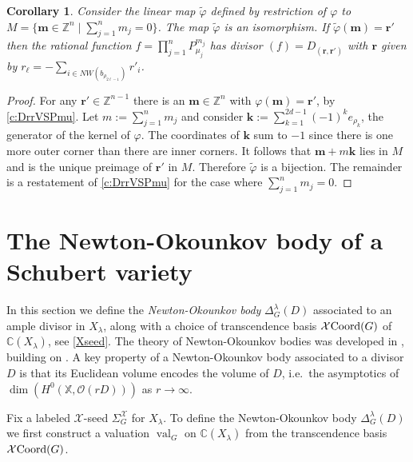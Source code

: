 \documentclass{amsart}
\newtheorem{corollary}[thm]{Corollary}
\theoremstyle{definition}
\numberwithin{equation}{section}
\newcommand{\NO}{\Delta}
\newcommand{\C}{\mathbb{C}}
\newcommand{\Z}{\mathbb{Z}}
\newcommand{\val}{{\operatorname{val}}}
\newcommand{\TBG}{{\mathcal X\hskip -.05cm\operatorname{Coord}(G)}}
\newcommand{\X}{\mathbb X}
\begin{document}
\begin{corollary}\label{c:RationalPmu}
Consider the linear map $\tilde\varphi$ defined by restriction of $\varphi$ to $M=\{\mathbf m\in \Z^{n}\mid \sum_{j=1}^n m_j=0\}$. 
The map $\tilde\varphi$ is an isomorphism. If $\tilde\varphi(\mathbf m)=\mathbf r'$ then the rational function $f=\prod_{j=1}^n P_{\mu_j}^{m_j}$ has divisor $(f)=D_{(\mathbf r,\mathbf r')}$ with $\mathbf r$ given by $r_\ell=-\sum_{i\in NW(b_{\rho_{2\ell-1}})}r'_i$.
\end{corollary}

\begin{proof} For any $\mathbf r'\in\Z^{n-1}$ there is an $\mathbf m\in\Z^n$ with $\varphi(\mathbf m)=\mathbf r'$, by \cref{c:DrrVSPmu}. Let $m:=\sum_{j=1}^n m_j$ and consider $\mathbf k:=\sum_{k=1}^{2d-1} (-1)^k e_{\rho_{k}}$, the generator of the kernel of $\varphi$. The coordinates of $\mathbf k$ sum to $-1$ since there is one more outer corner than there are inner corners. It follows that $\mathbf m + m \mathbf k$ lies in $M$ and is the unique preimage of $\mathbf r'$ in $M$. Therefore $\tilde\varphi$ is a bijection. The remainder is a restatement of \cref{c:DrrVSPmu} for the case where $\sum_{j=1}^{n} m_j=0$. 
\end{proof}

\section{The Newton-Okounkov body of a Schubert variety}\label{sec:NO}





In this section we define the {\it Newton-Okounkov  body} $\NO_{G}^{\lambda}(D)$
 associated to an ample divisor in $X_{\lambda}$, 
 along with a choice of transcendence basis $\TBG$ of $\C(X_{\lambda})$, 
see \cref{Xseed}.
 The theory of Newton-Okounkov bodies was  developed  in 
\cite{KavehKhovanskii,KK2, LazarsfeldMustata, Anderson},  building on 
\cite{Ok96, Okounkov:symplectic,Ok03}. 
 A key property of a Newton-Okounkov  body associated to a divisor $D$ is that its Euclidean volume encodes the volume of $D$, i.e.\ the asymptotics of $\dim(H^0(\X,\mathcal O(rD)))$ as $r\to\infty$.

Fix a  labeled $\mathcal{X}$-seed $\Sigma^{\mathcal X}_G$  for $X_{\lambda}$.
To define the Newton-Okounkov  body $\NO^{\lambda}_G(D)$  we first construct a valuation $\val_G$ on $\C(X_{\lambda})$ from the transcendence basis $\TBG$.
\end{document}
